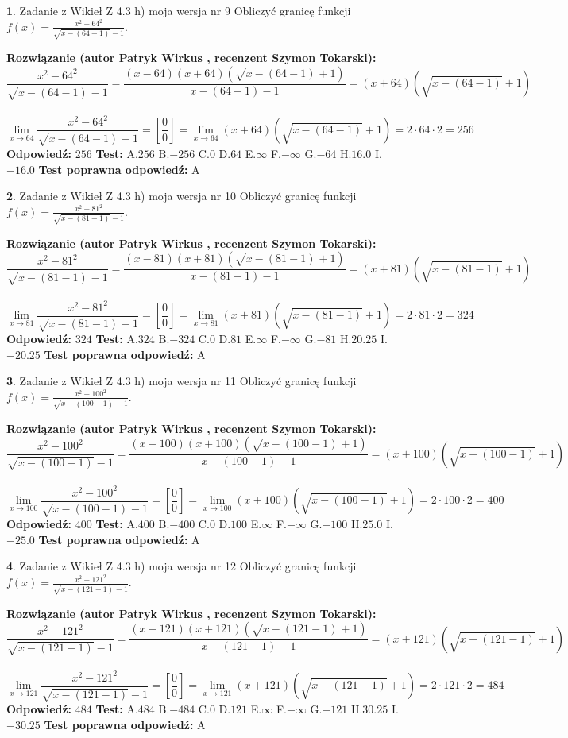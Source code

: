 \documentclass[12pt, a4paper]{article}
\theoremstyle{definition} %
\newtheorem{zad}{}
\newcommand{\zadStart}[1]{\begin{zad}#1\newline}
\newcommand{\zadStop}{\end{zad}}
\newcommand{\rozwStart}[2]{\noindent \textbf{Rozwiązanie (autor #1 , recenzent #2): }\newline}
\newcommand{\rozwStop}{\newline}
\newcommand{\odpStart}{\noindent \textbf{Odpowiedź:}\newline}
\newcommand{\odpStop}{\newline}
\newcommand{\testStart}{\noindent \textbf{Test:}\newline}
\newcommand{\testStop}{\newline}
\newcommand{\kluczStart}{\noindent \textbf{Test poprawna odpowiedź:}\newline}
\newcommand{\kluczStop}{\newline}
\begin{document}
\zadStart{Zadanie z Wikieł Z 4.3 h) moja wersja nr 9}
Obliczyć granicę funkcji $f(x)=\frac{x^{2} - 64^{2}}{\sqrt{x-(64-1)}-1}$.
\zadStop
\rozwStart{Patryk Wirkus}{Szymon Tokarski}
$$\frac{x^{2} - 64^{2}}{\sqrt{x-(64-1)}-1}=\frac{(x-64)(x+64)(\sqrt{x-(64-1)}+1)}{x-(64-1)-1}=(x+64)(\sqrt{x-(64-1)}+1)$$
\\
$$\lim\limits_{x\to 64}\frac{x^{2} - 64^{2}}{\sqrt{x-(64-1)}-1}=[\frac{0}{0}]=
\lim\limits_{x\to 64}(x+64)(\sqrt{x-(64-1)}+1) = 2\cdot64 \cdot 2 = 256$$
\rozwStop
\odpStart
$256$
\odpStop
\testStart
A.$256$
B.$-256$
C.$0$
D.$64$
E.$\infty$
F.$-\infty$
G.$-64$
H.$16.0$
I.$-16.0$
\testStop
\kluczStart
A
\kluczStop



\zadStart{Zadanie z Wikieł Z 4.3 h) moja wersja nr 10}
Obliczyć granicę funkcji $f(x)=\frac{x^{2} - 81^{2}}{\sqrt{x-(81-1)}-1}$.
\zadStop
\rozwStart{Patryk Wirkus}{Szymon Tokarski}
$$\frac{x^{2} - 81^{2}}{\sqrt{x-(81-1)}-1}=\frac{(x-81)(x+81)(\sqrt{x-(81-1)}+1)}{x-(81-1)-1}=(x+81)(\sqrt{x-(81-1)}+1)$$
\\
$$\lim\limits_{x\to 81}\frac{x^{2} - 81^{2}}{\sqrt{x-(81-1)}-1}=[\frac{0}{0}]=
\lim\limits_{x\to 81}(x+81)(\sqrt{x-(81-1)}+1) = 2\cdot81 \cdot 2 = 324$$
\rozwStop
\odpStart
$324$
\odpStop
\testStart
A.$324$
B.$-324$
C.$0$
D.$81$
E.$\infty$
F.$-\infty$
G.$-81$
H.$20.25$
I.$-20.25$
\testStop
\kluczStart
A
\kluczStop



\zadStart{Zadanie z Wikieł Z 4.3 h) moja wersja nr 11}
Obliczyć granicę funkcji $f(x)=\frac{x^{2} - 100^{2}}{\sqrt{x-(100-1)}-1}$.
\zadStop
\rozwStart{Patryk Wirkus}{Szymon Tokarski}
$$\frac{x^{2} - 100^{2}}{\sqrt{x-(100-1)}-1}=\frac{(x-100)(x+100)(\sqrt{x-(100-1)}+1)}{x-(100-1)-1}=(x+100)(\sqrt{x-(100-1)}+1)$$
\\
$$\lim\limits_{x\to 100}\frac{x^{2} - 100^{2}}{\sqrt{x-(100-1)}-1}=[\frac{0}{0}]=
\lim\limits_{x\to 100}(x+100)(\sqrt{x-(100-1)}+1) = 2\cdot100 \cdot 2 = 400$$
\rozwStop
\odpStart
$400$
\odpStop
\testStart
A.$400$
B.$-400$
C.$0$
D.$100$
E.$\infty$
F.$-\infty$
G.$-100$
H.$25.0$
I.$-25.0$
\testStop
\kluczStart
A
\kluczStop



\zadStart{Zadanie z Wikieł Z 4.3 h) moja wersja nr 12}
Obliczyć granicę funkcji $f(x)=\frac{x^{2} - 121^{2}}{\sqrt{x-(121-1)}-1}$.
\zadStop
\rozwStart{Patryk Wirkus}{Szymon Tokarski}
$$\frac{x^{2} - 121^{2}}{\sqrt{x-(121-1)}-1}=\frac{(x-121)(x+121)(\sqrt{x-(121-1)}+1)}{x-(121-1)-1}=(x+121)(\sqrt{x-(121-1)}+1)$$
\\
$$\lim\limits_{x\to 121}\frac{x^{2} - 121^{2}}{\sqrt{x-(121-1)}-1}=[\frac{0}{0}]=
\lim\limits_{x\to 121}(x+121)(\sqrt{x-(121-1)}+1) = 2\cdot121 \cdot 2 = 484$$
\rozwStop
\odpStart
$484$
\odpStop
\testStart
A.$484$
B.$-484$
C.$0$
D.$121$
E.$\infty$
F.$-\infty$
G.$-121$
H.$30.25$
I.$-30.25$
\testStop
\kluczStart
A
\kluczStop
\end{document}
